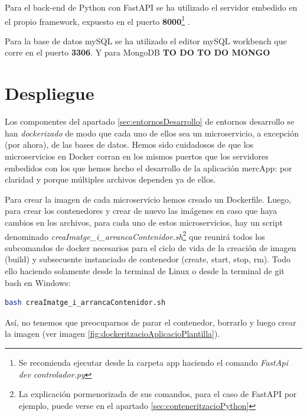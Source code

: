\documentclass[a4paper,12pt]{report}
\begin{document}
				Para el back-end de Python con FastAPI se ha utilizado el servidor embedido en el propio framework, expuesto en el puerto \textbf{8000}\footnote{Se recomienda ejecutar desde la carpeta app haciendo el comando \textit{FastApi dev controlador.py}} .
				
				Para la base de datos mySQL se ha utilizado el editor mySQL workbench que corre en el puerto \textbf{3306}. Y para MongoDB \textbf{TO DO TO DO MONGO}
		
	
			\section{Despliegue}
			\label{sec:despliegue}
				Los componentes del apartado \ref{sec:entornosDesarrollo} de entornos  desarrollo se han \textit{dockerizado} de modo que cada uno de ellos sea un microservicio, a excepción (por ahora), de las bases de datos. Hemos sido cuidadosos de que los microservicios en Docker corran en los mismos puertos que los servidores embedidos con los que hemos hecho el desarrollo de la aplicación mercApp: por claridad y porque múltiples archivos dependen ya de ellos.
				
				Para crear la imagen de cada microservicio hemos creado un Dockerfile. Luego, para crear los contenedores y crear de nuevo las imágenes en caso que haya cambios en los archivos, para cada uno de estos microservicios, hay un script denominado \textit{creaImatge\_i\_arrancaContenidor.sh}\footnote{La explicación pormenorizada de sus comandos, para el caso de FastAPI por ejemplo, puede verse en el apartado \ref{sec:conteneritzacioPython}} que reunirá todos los subcomandos de docker necesarios para el ciclo de vida de la creación de imagen (build) y subsecuente instanciado de contenedor (create, start, stop, rm). Todo ello haciendo solamente desde la terminal de Linux o desde la terminal de git bash en Windows: 
				
				\begin{lstlisting}[language=bash]
	bash creaImatge_i_arrancaContenidor.sh
				\end{lstlisting}
				
				
				
				
				
				Así, no tenemos que preocuparnos de parar el contenedor, borrarlo y luego crear la imagen (ver imagen \ref{fig:dockeritzacioAplicacioPlantilla}).
				
\end{document}
